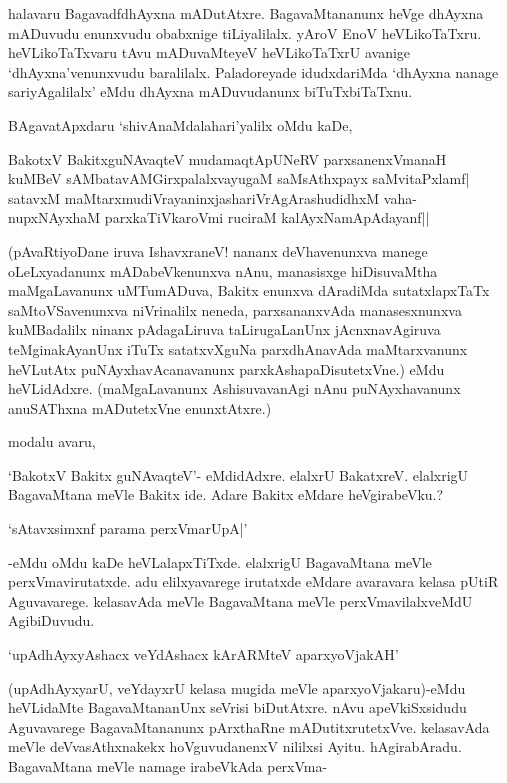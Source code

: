 halavaru BagavadfdhAyxna mADutAtxre. BagavaMtananunx heVge dhAyxna mADuvudu enunxvudu obabxnige tiLiyalilalx. yAroV EnoV heVLikoTaTxru. heVLikoTaTxvaru tAvu mADuvaMteyeV heVLikoTaTxrU avanige `dhAyxna'venunxvudu baralilalx. Paladoreyade idudxdariMda `dhAyxna nanage sariyAgalilalx' eMdu dhAyxna mADuvudanunx biTuTxbiTaTxnu.

BAgavatApxdaru `shivAnaMdalahari'yalilx oMdu kaDe,

\begin{shloka}
BakotxV BakitxguNAvaqteV mudamaqtApUNeRV parxsanenxVmanaH\\
kuMBeV sAMbatavAMGirxpalalxvayugaM saMsAthxpayx saMvitaPxlamf|\\
satavxM maMtarxmudiVrayaninxjashariVrAgArashudidhxM vaha-\\
nupxNAyxhaM parxkaTiVkaroVmi ruciraM kalAyxNamApAdayanf||
\end{shloka}

(pAvaRtiyoDane iruva IshavxraneV! nananx deVhavenunxva manege oLeLxyadanunx mADabeVkenunxva nAnu, manasisxge hiDisuvaMtha maMgaLavanunx uMTumADuva, Bakitx enunxva dAradiMda sutatxlapxTaTx saMtoVSavenunxva niVrinalilx neneda, parxsananxvAda manasesxnunxva kuMBadalilx ninanx pAdagaLiruva taLirugaLanUnx jAcnxnavAgiruva teMginakAyanUnx iTuTx satatxvXguNa parxdhAnavAda maMtarxvanunx heVLutAtx puNAyxhavAcanavanunx parxkAshapaDisutetxVne.) eMdu heVLidAdxre. (maMgaLavanunx AshisuvavanAgi nAnu puNAyxhavanunx anuSAThxna mADutetxVne enunxtAtxre.)

modalu avaru, 

`BakotxV Bakitx guNAvaqteV'- eMdidAdxre. elalxrU BakatxreV. elalxrigU BagavaMtana meVle Bakitx ide. Adare Bakitx eMdare heVgirabeVku.?

\begin{shloka}
`sAtavxsimxnf parama perxVmarUpA|'
\end{shloka}

-eMdu oMdu kaDe heVLalapxTiTxde. elalxrigU BagavaMtana meVle perxVmavirutatxde. adu elilxyavarege irutatxde eMdare avaravara kelasa pUtiR Aguvavarege. kelasavAda meVle BagavaMtana meVle perxVmavilalxveMdU AgibiDuvudu.

\begin{shloka}
`upAdhAyxyAshacx veYdAshacx kArARMteV aparxyoVjakAH'
\end{shloka}

(upAdhAyxyarU, veYdayxrU kelasa mugida meVle aparxyoVjakaru)-eMdu heVLidaMte BagavaMtananUnx seVrisi biDutAtxre. nAvu apeVkiSxsidudu Aguvavarege BagavaMtananunx pArxthaRne mADutitxrutetxVve. kelasavAda meVle deVvasAthxnakekx hoVguvudanenxV nililxsi Ayitu. hAgirabAradu. BagavaMtana meVle namage irabeVkAda perxVma-

